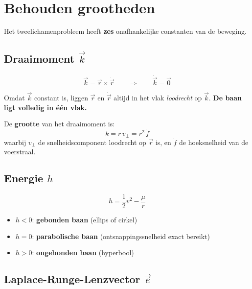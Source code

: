 \documentclass[11pt, a4paper]{article}
\begin{document}
\section{Behouden grootheden}

Het tweelichamenprobleem heeft \textbf{zes} onafhankelijke constanten van de beweging.

\subsection{Draaimoment $\vec{k}$}

\begin{formule}
\[
  \vec{k} = \vec{r} \times \dot{\vec{r}}
  \qquad \Rightarrow \qquad \dot{\vec{k}} = \vec{0}
\]
\end{formule}

\begin{weetje}
Omdat $\vec{k}$ constant is, liggen $\vec{r}$ en $\dot{\vec{r}}$ altijd in het vlak \emph{loodrecht} op $\vec{k}$.
\textbf{De baan ligt volledig in één vlak.}
\end{weetje}

De \textbf{grootte} van het draaimoment is:
\[
  k = r\,v_\perp = r^2\,\dot{f}
\]
waarbij $v_\perp$ de snelheidscomponent loodrecht op $\vec{r}$ is, en $\dot{f}$ de hoeksnelheid van de voerstraal.

\subsection{Energie $h$}

\begin{formule}
\[
  \boxed{h = \frac{1}{2}v^2 - \frac{\mu}{r}}
\]
\begin{itemize}[leftmargin=1.5em, itemsep=1pt]
  \item $h < 0$: \textbf{gebonden baan} (ellips of cirkel)
  \item $h = 0$: \textbf{parabolische baan} (ontsnappingssnelheid exact bereikt)
  \item $h > 0$: \textbf{ongebonden baan} (hyperbool)
\end{itemize}
\end{formule}

\subsection{Laplace-Runge-Lenzvector $\vec{e}$}
\end{document}

